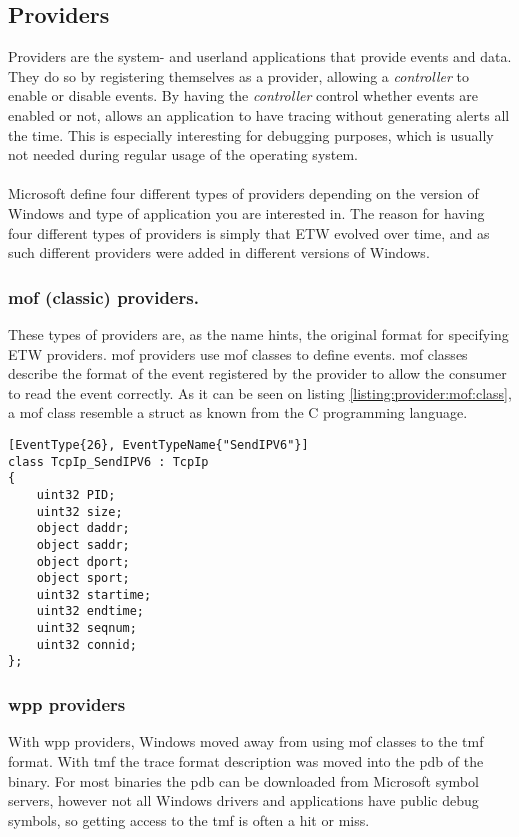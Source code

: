 \documentclass{report}
\begin{document}
\subsection{Providers}
\label{sec:etw:providers}
Providers are the system- and userland applications that provide events and data. They do so by registering themselves as a provider, allowing a \emph{controller} to enable or disable events. By having the \emph{controller} control whether events are enabled or not, allows an application to have tracing without generating alerts all the time. This is especially interesting for debugging purposes, which is usually not needed during regular usage of the operating system.
\\
\\
Microsoft define four different types of providers depending on the version of Windows and type of application you are interested in. The reason for having four different types of providers is simply that \gls{ETW} evolved over time, and as such different providers were added in different versions of Windows\cite{url:etw:provider-types}.

\subsubsection{\gls{mof} (classic) providers.}
These types of providers are, as the name hints, the original format for specifying \gls{ETW} providers. \gls{mof} providers use \gls{mof} classes\cite{url:etw:provider-types:mof:classes} to define events. \gls{mof} classes describe the format of the event registered by the provider to allow the consumer to read the event correctly. As it can be seen on listing \ref{listing:provider:mof:class}, a \gls{mof} class resemble a struct as known from the C programming language.

\begin{listing}[H]
\begin{verbatim}
[EventType{26}, EventTypeName{"SendIPV6"}]
class TcpIp_SendIPV6 : TcpIp
{
    uint32 PID;
    uint32 size;
    object daddr;
    object saddr;
    object dport;
    object sport;
    uint32 startime;
    uint32 endtime;
    uint32 seqnum;
    uint32 connid;
};
\end{verbatim}
\caption{\texttt{TcpIp_SendIPV6 : TcpIp} \gls{mof} class}
\label{listing:provider:mof:class}
\end{listing}

\subsubsection{\gls{wpp} providers}
With \gls{wpp} providers, Windows moved away from using \gls{mof} classes to the \gls{tmf} format. With \gls{tmf} the trace format description was moved into the \gls{pdb} of the binary. For most binaries the \gls{pdb} can be downloaded from Microsoft symbol servers\cite{url:microsoft:public-symbol-server}, however not all Windows drivers and applications have public debug symbols, so getting access to the \gls{tmf} is often a hit or miss.
\end{document}
